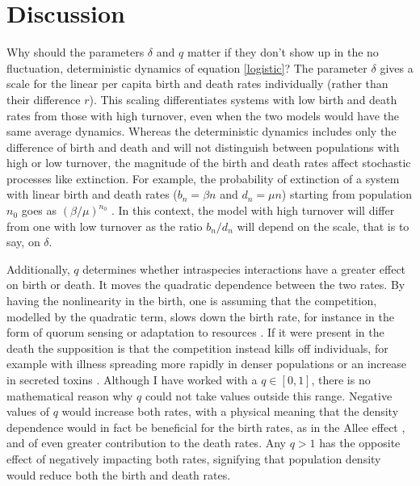 \section{Discussion}

Why should the parameters $\delta$ and $q$ matter if they don't show up in the no fluctuation, deterministic dynamics of equation \ref{logistic}? 
The parameter $\delta$ gives a scale for the linear per capita birth and death rates individually (rather than their difference $r$).
This scaling differentiates systems with low birth and death rates from those with high turnover, even when the two models would have the same average dynamics. 
Whereas the deterministic dynamics includes only the difference of birth and death and will not distinguish between populations with high or low turnover, the magnitude of the birth and death rates affect stochastic processes like extinction. 
For example, the probability of extinction of a system with linear birth and death rates ($b_n=\beta n$ and $d_n=\mu n$) starting from population $n_0$ goes as $(\beta/\mu)^{n_0}$ \cite{Nisbet1982}.
In this context, the model with high turnover will differ from one with low turnover as the ratio $b_n/d_n$ will depend on the scale, that is to say, on $\delta$. 

Additionally, $q$ determines whether intraspecies interactions have a greater effect on birth or death. 
It moves the quadratic dependence between the two rates. 
By having the nonlinearity in the birth, one is assuming that the competition, modelled by the quadratic term, slows down the birth rate, for instance in the form of quorum sensing \cite{Nadell2008} or adaptation to resources \cite{Vulic2001}. 
If it were present in the death the supposition is that the competition instead kills off individuals, for example with illness spreading more rapidly in denser populations \cite{Greenhalgh1990} or an increase in secreted toxins \cite{VanMelderen2009,Rankin2012}.
Although I have worked with a $q \in [0,1]$, there is no mathematical reason why $q$ could not take values outside this range. 
Negative values of $q$ would increase both rates, with a physical meaning that the density dependence would in fact be beneficial for the birth rates, as in the Allee effect \cite{Chesson2000,Assaf2016}, and of even greater contribution to the death rates. 
Any $q>1$ has the opposite effect of negatively impacting both rates, signifying that population density would reduce both the birth and death rates. %

